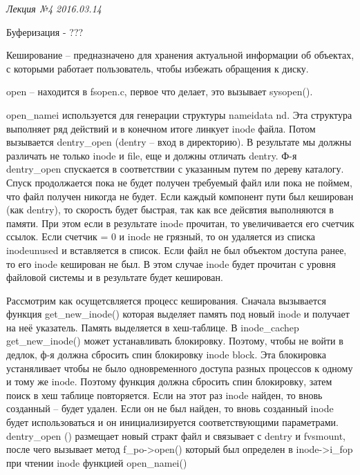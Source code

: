\clearpage
\begin{flushright}
	\textit{Лекция №4}
	\textit{2016.03.14}
\end{flushright}

Буферизация - ???

Кеширование – предназначено для хранения актуальной информации об объектах, с которыми работает пользователь, чтобы избежать обращения к диску.

open – находится в  fsopen.c, первое что делает, это вызывает sysopen(). 

 

open\_namei используется для генерации структуры nameidata nd. Эта структура выполняет ряд действий и в конечном итоге линкует inode файла. Потом вызывается dentry\_open (dentry – вход в директорию). В результате мы должны различать не только inode  и file, еще и должны отличать dentry. Ф-я  dentry\_open спускается в соответствии с указанным путем по дереву каталогу. Спуск продолжается пока не будет получен требуемый файл или пока не поймем, что файл получен никогда не будет. Если каждый компонент пути был кеширован (как dentry), то скорость будет быстрая, так как все дейсвтия выполняются в памяти. При этом если в результате inode прочитан, то увеличивается его счетчик ссылок. Если счетчик = 0 и inode не грязный, то он удаляется из списка inodeunused   и вставляется в список. Если файл не был объектом доступа ранее, то его inode  кеширован не был. В этом случае inode будет прочитан с уровня файловой системы и в результате будет кеширован. 

Рассмотрим как осущетсвляется процесс кеширования. Сначала вызывается функция get\_new\_inode()  которая выделяет память под новый inode и получает на неё указатель. Память выделяется в хеш-таблице. В inode\_cachep
get\_new\_inode()   может устанавливать блокировку. Поэтому, чтобы не войти в дедлок, ф-я должна сбросить спин блокировку inode  block. Эта блокировка устаняливает чтобы не было одновременного доступа разных процессов к одному и тому же inode. Поэтому функция должна сбросить спин блокировку, затем поиск в хеш таблице повторяется. Если на этот раз inode найден, то вновь созданный – будет удален. Если он не был найден, то вновь созданный inode будет использоваться и он инициализируется соответствующими параметрами. 
dentry\_open () размещает новый стракт файл и связывает с dentry и fvsmount, после чего вызывает метод f\_po->open() который был определен в inode->i\_fop при чтении inode функцией open\_namei()

